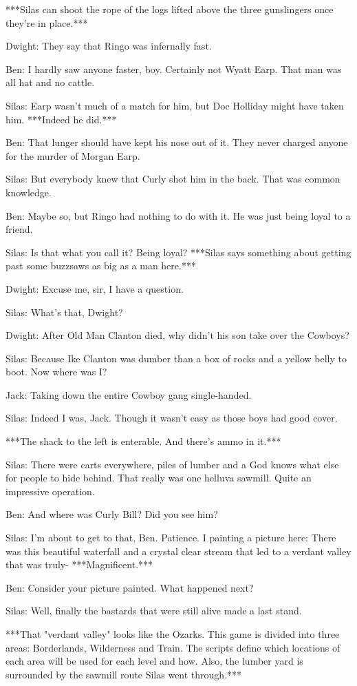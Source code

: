 \documentclass{article}
\begin{document}
***Silas can shoot the rope of the logs lifted above the three gunslingers once they're in place.***

Dwight: They say that Ringo was infernally fast.

Ben: I hardly saw anyone faster, boy. Certainly not Wyatt Earp. That man was all hat and no cattle.

Silas: Earp wasn't much of a match for him, but Doc Holliday might have taken him. ***Indeed he did.***

Ben: That lunger should have kept his nose out of it. They never charged anyone for the murder of Morgan Earp.

Silas: But everybody knew that Curly shot him in the back. That was common knowledge.

Ben: Maybe so, but Ringo had nothing to do with it. He was just being loyal to a friend.

Silas: Is that what you call it? Being loyal? ***Silas says something about getting past some buzzsaws as big as a man here.***

Dwight: Excuse me, sir, I have a question.

Silas: What's that, Dwight?

Dwight: After Old Man Clanton died, why didn't his son take over the Cowboys?

Silas: Because Ike Clanton was dumber than a box of rocks and a yellow belly to boot. Now where was I?

Jack: Taking down the entire Cowboy gang single-handed.

Silas: Indeed I was, Jack. Though it wasn't easy as those boys had good cover.

***The shack to the left is enterable. And there's ammo in it.***

Silas: There were carts everywhere, piles of lumber and a God knows what else for people to hide behind. That really was one helluva sawmill. Quite an impressive operation.

Ben: And where was Curly Bill? Did you see him?

Silas: I'm about to get to that, Ben. Patience. I painting a picture here: There was this beautiful waterfall and a crystal clear stream that led to a verdant valley that was truly- ***Magnificent.***

Ben: Consider your picture painted. What happened next?

Silas: Well, finally the bastards that were still alive made a last stand.

***That "verdant valley" looks like the Ozarks. This game is divided into three areas: Borderlands, Wilderness and Train. The scripts define which locations of each area will be used for each level and how. Also, the lumber yard is surrounded by the sawmill route Silas went through.***
\end{document}
